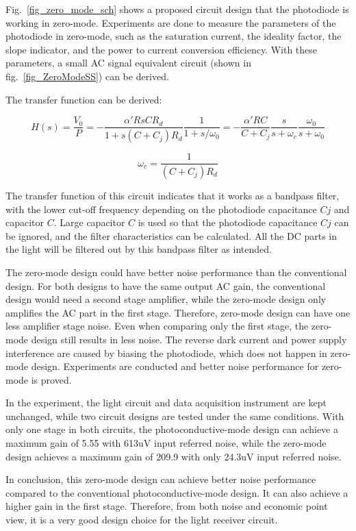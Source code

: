 Fig.~\ref{fig_zero_mode_sch} shows a proposed circuit design that the photodiode is working in zero-mode.  Experiments are done to measure the parameters of the photodiode in zero-mode, such as the saturation current, the ideality factor, the slope indicator, and the power to current conversion efficiency.  With these parameters, a small AC signal equivalent circuit (shown in fig.~\ref{fig_ZeroModeSS}) can be derived.  

The transfer function can be derived:

$$H(s) = \frac{V_0}{P} = - \frac{\alpha'RsCR_d}{1+s(C+C_j)R_d}\frac{1}{1+s/\omega_0} = - \frac{\alpha'RC}{C+C_j} \frac{s}{s+\omega_c} \frac{\omega_0}{s+\omega_0}$$

$$\omega_c = \frac{1}{(C+C_j)R_d}$$


The transfer function of this circuit indicates that it works as a bandpass filter, with the lower cut-off frequency depending on the photodiode capacitance $Cj$ and capacitor $C$.  Large capacitor $C$ is used so that the photodiode capacitance $Cj$ can be ignored, and the filter characteristics can be calculated.  All the DC parts in the light will be filtered out by this bandpass filter as intended.

The zero-mode design could have better noise performance than the conventional design.  For both designs to have the same output AC gain, the conventional design would need a second stage amplifier, while the zero-mode design only amplifies the AC part in the first stage.  Therefore, zero-mode design can have one less amplifier stage noise.  Even when comparing only the first stage, the zero-mode design still results in less noise.  The reverse dark current and power supply interference are caused by biasing the photodiode, which does not happen in zero-mode design.  Experiments are conducted and better noise performance for zero-mode is proved.

In the experiment, the light circuit and data acquisition instrument are kept unchanged, while two circuit designs are tested under the same conditions.  With only one stage in both circuits, the photoconductive-mode design can achieve a maximum gain of 5.55 with 613uV input referred noise, while the zero-mode design achieves a maximum gain of 209.9 with only 24.3uV input referred noise.

In conclusion, this zero-mode design can achieve better noise performance compared to the conventional photoconductive-mode design.  It can also achieve a higher gain in the first stage.  Therefore, from both noise and economic point view, it is a very good design choice for the light receiver circuit.


